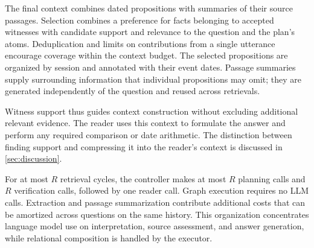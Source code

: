 The final context combines dated propositions with summaries of their
source passages. Selection combines a preference for facts belonging to accepted witnesses
with candidate support and relevance to the question and the plan's atoms. Deduplication and limits on contributions from a
single utterance encourage coverage within the context budget.
The selected propositions are organized by session and annotated with
their event dates. Passage summaries supply surrounding information
that individual propositions may omit; they are generated independently
of the question and reused across retrievals.

Witness support thus guides context construction without excluding
additional relevant evidence. The reader uses this context to formulate
the answer and perform any required comparison or date arithmetic.
The distinction between finding support and compressing it into the
reader's context is discussed in \cref{sec:discussion}.

For at most $R$ retrieval cycles, the controller makes at most $R$
planning calls and $R$ verification calls, followed by one reader call.
Graph execution requires no \ac{LLM} calls. Extraction and passage
summarization contribute additional costs that can be amortized across
questions on the same history. This organization concentrates language
model use on interpretation, source assessment, and answer generation,
while relational composition is handled by the executor.
